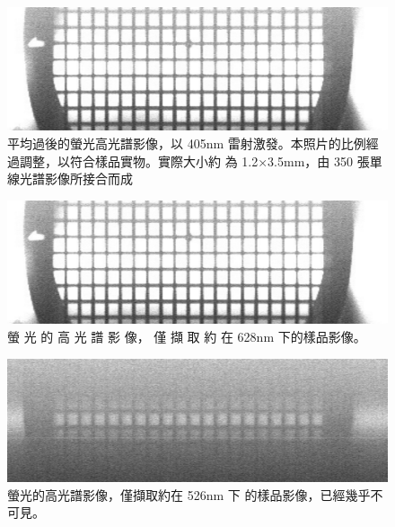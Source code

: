 \documentclass[12pt]{article}
\begin{document}
\begin{figure}
    \centering
    \includegraphics[width = 0.9\linewidth]{1211_10um_15msLaser-1.jpg}
    \caption{平均過後的螢光高光譜影像，以 405nm 雷射激發。本照片的比例經過調整，以符合樣品實物。實際大小約
    為 1.2×3.5mm，由 350 張單線光譜影像所接合而成}
    \label{fig: flourenceAvg}
\end{figure}

\begin{figure}
    \centering
    \includegraphics[width = 0.9\linewidth]{1211_10um_15msLaser-1.jpg}
    \caption{螢 光 的 高 光 譜 影 像， 僅 擷 取 約 在
    628nm 下的樣品影像。}
    \label{fig: flourence628}
\end{figure}

\begin{figure}
    \centering
    \includegraphics[width = 0.9\linewidth]{1211_10um_15msLaser.tiff137-1.jpg}
    \caption{螢光的高光譜影像，僅擷取約在 526nm 下
    的樣品影像，已經幾乎不可見。}
    \label{fig: flourence526}
\end{figure}
\end{document}
